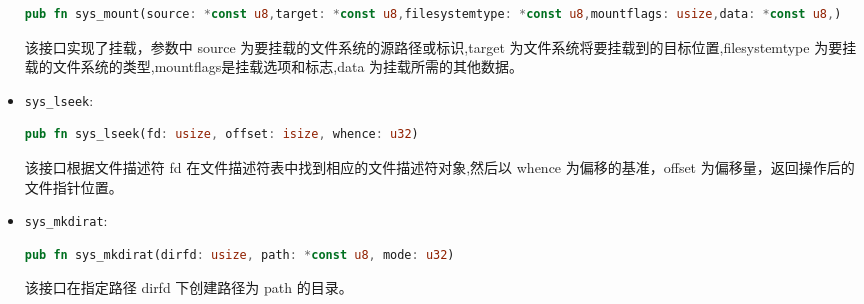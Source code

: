 \begin{itemize}
	\begin{lstlisting}[language=rust]
	pub fn sys_mount(source: *const u8,target: *const u8,filesystemtype: *const u8,mountflags: usize,data: *const u8,)
	\end{lstlisting}
	该接口实现了挂载，参数中 source 为要挂载的文件系统的源路径或标识,target 为文件系统将要挂载到的目标位置,filesystemtype 为要挂载的文件系统的类型,mountflags是挂载选项和标志,data 为挂载所需的其他数据。
	\item \texttt{sys\_lseek}: 
	\begin{lstlisting}[language=rust]
	pub fn sys_lseek(fd: usize, offset: isize, whence: u32)
	\end{lstlisting}
	该接口根据文件描述符 fd 在文件描述符表中找到相应的文件描述符对象,然后以 whence 为偏移的基准，offset 为偏移量，返回操作后的文件指针位置。
	\item \texttt{sys\_mkdirat}: 
	\begin{lstlisting}[language=rust]
	pub fn sys_mkdirat(dirfd: usize, path: *const u8, mode: u32)
	\end{lstlisting}
	该接口在指定路径 dirfd 下创建路径为 path 的目录。
\end{itemize}